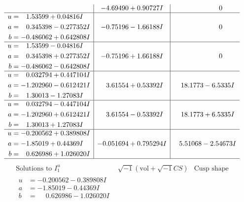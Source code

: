 \documentclass[1p]{elsarticle_modified}
\theoremstyle{definition}
\newcommand{\I}{\sqrt{-1}}
\begin{document}
$$\begin{array}{c|c|c}
 & -4.69490 + 0.90727 I & \phantom{-0.000000 } 0 \\ \hline\begin{aligned}
u &= \phantom{-}1.53599 + 0.04816 I \\
a &= \phantom{-}0.345398 - 0.277352 I \\
b &= -0.486062 + 0.642808 I\end{aligned}
 & -0.75196 - 1.66188 I & \phantom{-0.000000 } 0 \\ \hline\begin{aligned}
u &= \phantom{-}1.53599 - 0.04816 I \\
a &= \phantom{-}0.345398 + 0.277352 I \\
b &= -0.486062 - 0.642808 I\end{aligned}
 & -0.75196 + 1.66188 I & \phantom{-0.000000 } 0 \\ \hline\begin{aligned}
u &= \phantom{-}0.032794 + 0.447104 I \\
a &= -1.202960 - 0.612421 I \\
b &= \phantom{-}1.30013 - 1.27083 I\end{aligned}
 & \phantom{-}3.61554 + 0.53392 I & \phantom{-}18.1773 - 6.5335 I \\ \hline\begin{aligned}
u &= \phantom{-}0.032794 - 0.447104 I \\
a &= -1.202960 + 0.612421 I \\
b &= \phantom{-}1.30013 + 1.27083 I\end{aligned}
 & \phantom{-}3.61554 - 0.53392 I & \phantom{-}18.1773 + 6.5335 I \\ \hline\begin{aligned}
u &= -0.200562 + 0.389808 I \\
a &= -1.85019 + 0.44369 I \\
b &= \phantom{-}0.626986 + 1.026020 I\end{aligned}
 & -0.051694 + 0.795294 I & \phantom{-}5.51068 - 2.54673 I\\
 \hline 
 \end{array}$$\newpage$$\begin{array}{c|c|c}  
\text{Solutions to }I^u_{1}& \I (\text{vol} + \sqrt{-1}CS) & \text{Cusp shape}\\
 \hline 
\begin{aligned}
u &= -0.200562 - 0.389808 I \\
a &= -1.85019 - 0.44369 I \\
b &= \phantom{-}0.626986 - 1.026020 I\end{aligned}

\end{array}$$
\end{document}
